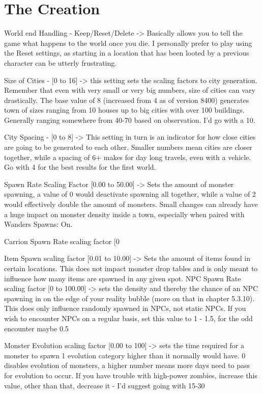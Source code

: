\documentclass[11pt]{report}
\begin{document}
\section{The Creation}

World end Handling - Keep/Reset/Delete -> Basically allows you to tell the game what happens to the world once you die. I personally prefer to play using the Reset settings, as starting in a location that has been looted by a previous character can be utterly frustrating.

Size of Cities - [0 to 16] -> this setting sets the scaling factors to city generation. Remember that even with very small or very big numbers, size of cities can vary drastically. The base value of 8 (increased from 4 as of version 8400)  generates town of sizes ranging from 10 houses up to big cities with over 100 buildings. Generally ranging somewhere from 40-70 based on observation. I'd go with a 10.

City Spacing - [0 to 8] -> This setting in turn is an indicator for how close cities are going to be generated to each other. Smaller numbers mean cities are closer together, while a spacing of 6+ makes for day long travels, even with a vehicle. Go with 4 for the best results for the first world.

Spawn Rate Scaling Factor [0.00 to 50.00] -> Sets the amount of monster spawning, a value of 0 would deactivate spawning all together, while a value of 2 would effectively double the amount of monsters. Small changes can already have a huge impact on monster density inside a town, especially when paired with Wanders Spawns: On.

Carrion Spawn Rate scaling factor [0%

Item Spawn scaling factor [0.01 to 10.00] -> Sets the amount of items found in certain locations. This does not impact monster drop tables and is only meant to influence how many items are spawned in any given spot.
NPC Spawn Rate scaling factor [0 to 100.00] -> sets the density and thereby the chance of an NPC spawning in on the edge of your reality bubble (more on that in chapter 5.3.10). This does only influence randomly spawned in NPCs, not static NPCs. If you wish to encounter NPCs on a regular basis, set this value to 1 - 1.5, for the odd encounter maybe 0.5

Monster Evolution scaling factor [0.00 to 100] -> sets the time required for a monster to spawn 1 evolution category higher than it normally would have. 0 disables evolution of monsters, a higher number means more days need to pass for evolution to occur. If you have trouble with high-power zombies, increase this value, other than that, decrease it - I'd suggest going with 15-30
\end{document}
